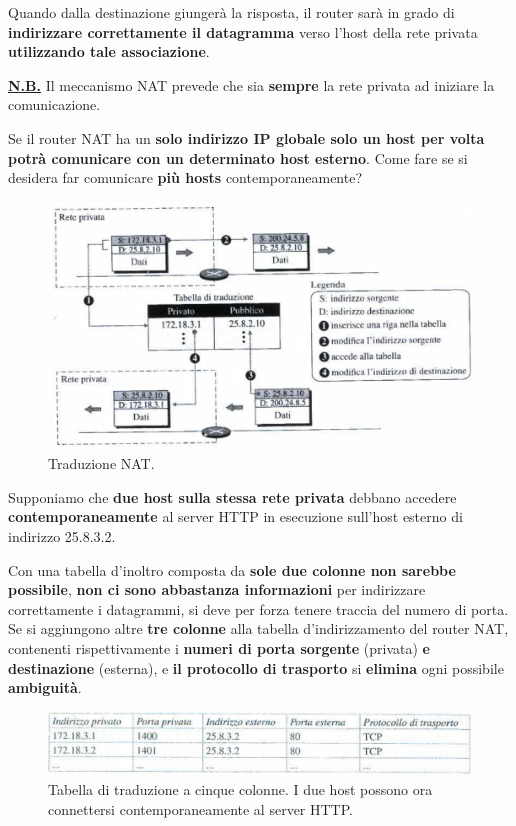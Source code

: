 \documentclass[11pt,a4paper,oneside]{book}
\theoremstyle{definition}
\begin{document}
Quando dalla destinazione giungerà la risposta, il router sarà in grado di \textbf{indirizzare correttamente il datagramma} verso l'host della rete privata \textbf{utilizzando tale associazione}.

\textbf{\underline{N.B.}} Il meccanismo NAT prevede che sia \textbf{sempre} la rete privata ad iniziare la comunicazione.

Se il router NAT ha un \textbf{solo indirizzo IP globale solo un host per volta potrà comunicare con un determinato host esterno}. Come fare se si desidera far comunicare \textbf{più hosts} contemporaneamente?

\pagebreak

\begin{figure}[!h]
	\includegraphics[scale=1.7]{Immagini/Ip_nat_tr.png}
	\centering
	\caption{Traduzione NAT.}
\end{figure}

Supponiamo che \textbf{due host sulla stessa rete privata} debbano accedere \textbf{contemporaneamente} al server HTTP in esecuzione sull'host esterno di indirizzo 25.8.3.2.

Con una tabella d'inoltro composta da \textbf{sole due colonne non sarebbe possibile}, \textbf{non ci sono abbastanza informazioni} per indirizzare correttamente i datagrammi, si deve per forza tenere traccia del numero di porta. Se si aggiungono altre \textbf{tre colonne} alla tabella d'indirizzamento del router NAT, contenenti rispettivamente i \textbf{numeri di porta sorgente} (privata)\textbf{ e destinazione} (esterna), e \textbf{il protocollo di trasporto} si \textbf{elimina} ogni possibile \textbf{ambiguità}.

\begin{figure}[!h]
	\includegraphics[scale=1.5]{Immagini/Ip_nat_1.png}
	\centering
	\caption{Tabella di traduzione a cinque colonne. I due host possono ora connettersi contemporaneamente al server HTTP.}
\end{figure}
\end{document}
